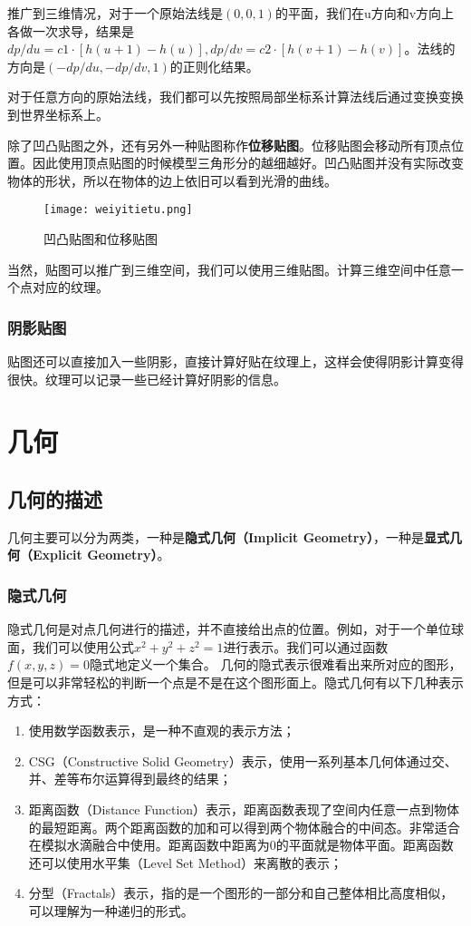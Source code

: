 \documentclass[openany]{progbookcn}
\begin{document}
推广到三维情况，对于一个原始法线是$(0,0,1)$的平面，我们在u方向和v方向上各做一次求导，结果是$dp/du=c1\cdot [h(u+1)-h(u)],dp/dv=c2\cdot [h(v+1)-h(v)]$。法线的方向是$(-dp/du,-dp/dv,1)$的正则化结果。

对于任意方向的原始法线，我们都可以先按照局部坐标系计算法线后通过变换变换到世界坐标系上。

除了凹凸贴图之外，还有另外一种贴图称作\textbf{位移贴图}。位移贴图会移动所有顶点位置。因此使用顶点贴图的时候模型三角形分的越细越好。凹凸贴图并没有实际改变物体的形状，所以在物体的边上依旧可以看到光滑的曲线。
\begin{figure}[H]
	\centering
	\texttt{[image: weiyitietu.png]}
	\caption{凹凸贴图和位移贴图}
	\label{fig:weiyitietu}
\end{figure}

当然，贴图可以推广到三维空间，我们可以使用三维贴图。计算三维空间中任意一个点对应的纹理。

\section{阴影贴图}
贴图还可以直接加入一些阴影，直接计算好贴在纹理上，这样会使得阴影计算变得很快。纹理可以记录一些已经计算好阴影的信息。

\part{几何}
\chapter{几何的描述}

几何主要可以分为两类，一种是\textbf{隐式几何（Implicit Geometry）}，一种是\textbf{显式几何（Explicit Geometry）}。

\section{隐式几何}
隐式几何是对点几何进行的描述，并不直接给出点的位置。例如，对于一个单位球面，我们可以使用公式$x^2+y^2+z^2=1$进行表示。我们可以通过函数$f(x,y,z)=0$隐式地定义一个集合。
几何的隐式表示很难看出来所对应的图形，但是可以非常轻松的判断一个点是不是在这个图形面上。隐式几何有以下几种表示方式：
\begin{enumerate}
	\item 使用数学函数表示，是一种不直观的表示方法；
	\item CSG（Constructive Solid Geometry）表示，使用一系列基本几何体通过交、并、差等布尔运算得到最终的结果；
	\item 距离函数（Distance Function）表示，距离函数表现了空间内任意一点到物体的最短距离。两个距离函数的加和可以得到两个物体融合的中间态。非常适合在模拟水滴融合中使用。距离函数中距离为0的平面就是物体平面。距离函数还可以使用水平集（Level Set Method）来离散的表示；
	\item 分型（Fractals）表示，指的是一个图形的一部分和自己整体相比高度相似，可以理解为一种递归的形式。
\end{enumerate}
\end{document}
